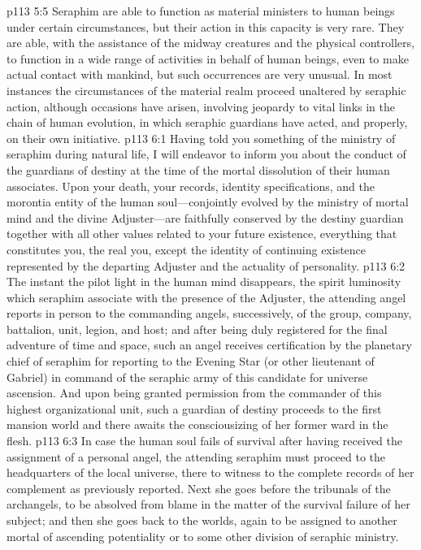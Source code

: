 \pc \vs p113 5:5 Seraphim are able to function as material ministers to human beings under certain circumstances, but their action in this capacity is very rare. They are able, with the assistance of the midway creatures and the physical controllers, to function in a wide range of activities in behalf of human beings, even to make actual contact with mankind, but such occurrences are very unusual. In most instances the circumstances of the material realm proceed unaltered by seraphic action, although occasions have arisen, involving jeopardy to vital links in the chain of human evolution, in which seraphic guardians have acted, and properly, on their own initiative.
\vs p113 6:1 Having told you something of the ministry of seraphim during natural life, I will endeavor to inform you about the conduct of the guardians of destiny at the time of the mortal dissolution of their human associates. Upon your death, your records, identity specifications, and the morontia entity of the human soul---conjointly evolved by the ministry of mortal mind and the divine Adjuster---are faithfully conserved by the destiny guardian together with all other values related to your future existence, everything that constitutes you, the real you, except the identity of continuing existence represented by the departing Adjuster and the actuality of personality.
\vs p113 6:2 The instant the pilot light in the human mind disappears, the spirit luminosity which seraphim associate with the presence of the Adjuster, the attending angel reports in person to the commanding angels, successively, of the group, company, battalion, unit, legion, and host; and after being duly registered for the final adventure of time and space, such an angel receives certification by the planetary chief of seraphim for reporting to the Evening Star (or other lieutenant of Gabriel) in command of the seraphic army of this candidate for universe ascension. And upon being granted permission from the commander of this highest organizational unit, such a guardian of destiny proceeds to the first mansion world and there awaits the consciousizing of her former ward in the flesh.
\pc \vs p113 6:3 In case the human soul fails of survival after having received the assignment of a personal angel, the attending seraphim must proceed to the headquarters of the local universe, there to witness to the complete records of her complement as previously reported. Next she goes before the tribunals of the archangels, to be absolved from blame in the matter of the survival failure of her subject; and then she goes back to the worlds, again to be assigned to another mortal of ascending potentiality or to some other division of seraphic ministry.
